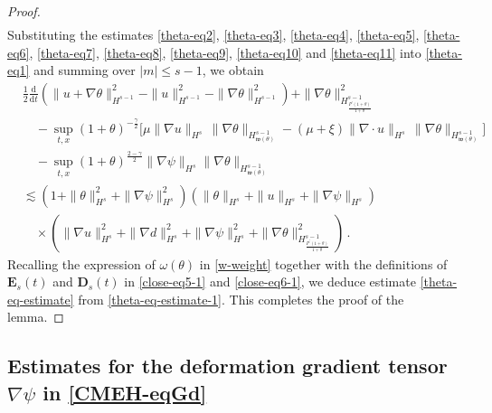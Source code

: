 \documentclass[reqno,11pt]{amsart}
\numberwithin{equation}{section}
\def\d{\mathrm{d}}
\def\no{\nonumber}
\def\w{\mathfrak{w}}
\begin{document}
\begin{proof}
\begin{equation}
\begin{aligned}
\end{aligned}
\end{equation}
Substituting the estimates \eqref{theta-eq2}, \eqref{theta-eq3}, \eqref{theta-eq4}, \eqref{theta-eq5}, \eqref{theta-eq6}, \eqref{theta-eq7}, \eqref{theta-eq8}, \eqref{theta-eq9}, \eqref{theta-eq10} and \eqref{theta-eq11} into \eqref{theta-eq1} and summing over $|m| \leq s-1$, we obtain
\begin{align}\label{theta-eq-estimate-1}
\no &\frac{1}{2} \frac{\d}{\d t} \left( \|u + \nabla \theta\|_{H^{s-1}}^2 - \|u\|_{H^{s-1}}^2 - \|\nabla \theta\|_{H^{s-1}}^2 \right) + \|\nabla \theta\|^2_{H^{s-1}_\frac{P^\prime(1+\theta)}{1+\theta}}\\
\no & \quad - \sup_{t,x} (1 + \theta)^{- \frac{\gamma}{2}} \big[ \mu \| \nabla u \|_{H^s} \, \| \nabla \theta \|_{H^{s-1}_{\w (\theta)}} - (\mu + \xi ) \| \nabla \cdot u \|_{H^s} \, \| \nabla \theta \|_{H^{s-1}_{\w (\theta)}} \big] \\
& \quad - \sup_{t,x} (1 + \theta)^\frac{2 - \gamma}{2} \|\nabla \psi\|_{H^s} \|\nabla \theta\|_{H^{s-1}_{\w (\theta)}} \\
\no & \lesssim \left( 1 + \|\theta\|_{H^s}^2 + \|\nabla \psi\|_{H^s}^2 \right) \left( \|\theta\|_{H^s} + \|u\|_{H^s} + \|\nabla \psi\|_{H^s} \right) \\
\no & \quad\times \left( \|\nabla u\|_{H^s}^2 + \|\nabla d\|_{H^s}^2 + \|\nabla \psi\|_{H^s}^2 + \|\nabla \theta\|_{H^{s-1}_\frac{P^\prime(1+\theta)}{1+\theta}}^2 \right) \,.
\end{align}
Recalling the expression of $\omega(\theta)$ in \eqref{w-weight} together with the definitions of $\mathbf{E}_s(t)$ and $\mathbf{D}_s(t)$ in \eqref{close-eq5-1} and \eqref{close-eq6-1}, we deduce estimate \eqref{theta-eq-estimate} from \eqref{theta-eq-estimate-1}. This completes the proof of the lemma.
\end{proof}

\subsection{Estimates for the deformation gradient tensor $\nabla \psi$ in \eqref{CMEH-eqGd}}
\end{document}
